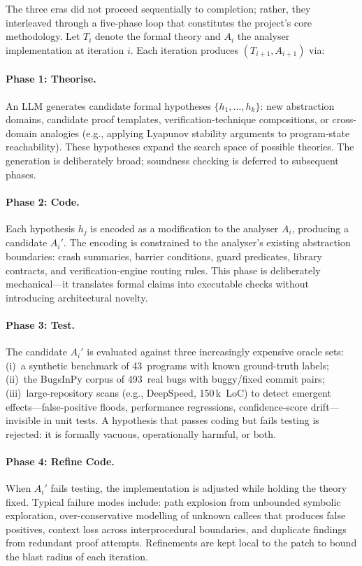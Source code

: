The three eras did not proceed sequentially to completion; rather, they interleaved through a five-phase loop that constitutes the project's core methodology.
Let $T_i$ denote the formal theory and $A_i$ the analyser implementation at iteration $i$.
Each iteration produces $(T_{i+1}, A_{i+1})$ via:

\paragraph{Phase 1: Theorise.}
An LLM generates candidate formal hypotheses $\{h_1, \ldots, h_k\}$: new abstraction domains, candidate proof templates, verification-technique compositions, or cross-domain analogies (e.g., applying Lyapunov stability arguments to program-state reachability).
These hypotheses expand the search space of possible theories.
The generation is deliberately broad; soundness checking is deferred to subsequent phases.

\paragraph{Phase 2: Code.}
Each hypothesis $h_j$ is encoded as a modification to the analyser $A_i$, producing a candidate $A_i'$.
The encoding is constrained to the analyser's existing abstraction boundaries: crash summaries, barrier conditions, guard predicates, library contracts, and verification-engine routing rules.
This phase is deliberately mechanical---it translates formal claims into executable checks without introducing architectural novelty.

\paragraph{Phase 3: Test.}
The candidate $A_i'$ is evaluated against three increasingly expensive oracle sets:
(i)~a synthetic benchmark of 43~programs with known ground-truth labels;
(ii)~the BugsInPy corpus of 493~real bugs with buggy/fixed commit pairs;
(iii)~large-repository scans (e.g., DeepSpeed, 150\,k~LoC) to detect emergent effects---false-positive floods, performance regressions, confidence-score drift---invisible in unit tests.
A hypothesis that passes coding but fails testing is rejected: it is formally vacuous, operationally harmful, or both.

\paragraph{Phase 4: Refine Code.}
When $A_i'$ fails testing, the implementation is adjusted while holding the theory fixed.
Typical failure modes include: path explosion from unbounded symbolic exploration, over-conservative modelling of unknown callees that produces false positives, context loss across interprocedural boundaries, and duplicate findings from redundant proof attempts.
Refinements are kept local to the patch to bound the blast radius of each iteration.

